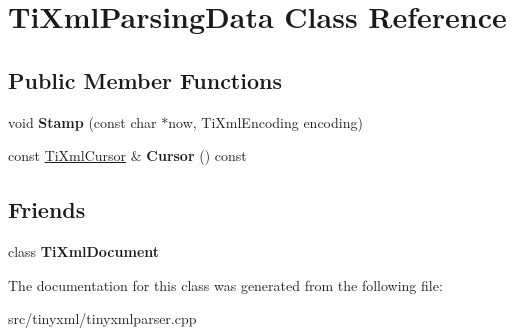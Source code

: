 \hypertarget{classTiXmlParsingData}{}\section{Ti\+Xml\+Parsing\+Data Class Reference}
\label{classTiXmlParsingData}
\subsection*{Public Member Functions}
\begin{DoxyCompactItemize}
\item 
void {\bfseries Stamp} (const char $\ast$now, Ti\+Xml\+Encoding encoding)\hypertarget{classTiXmlParsingData_a65cee8ab77a36c605db08c84b4c30a7d}{}\label{classTiXmlParsingData_a65cee8ab77a36c605db08c84b4c30a7d}

\item 
const \hyperlink{structTiXmlCursor}{Ti\+Xml\+Cursor} \& {\bfseries Cursor} () const \hypertarget{classTiXmlParsingData_a9e63d965fdb53ff4ac711e105269e918}{}\label{classTiXmlParsingData_a9e63d965fdb53ff4ac711e105269e918}

\end{DoxyCompactItemize}
\subsection*{Friends}
\begin{DoxyCompactItemize}
\item 
class {\bfseries Ti\+Xml\+Document}\hypertarget{classTiXmlParsingData_a173617f6dfe902cf484ce5552b950475}{}\label{classTiXmlParsingData_a173617f6dfe902cf484ce5552b950475}

\end{DoxyCompactItemize}


The documentation for this class was generated from the following file\+:\begin{DoxyCompactItemize}
\item 
src/tinyxml/tinyxmlparser.\+cpp\end{DoxyCompactItemize}
